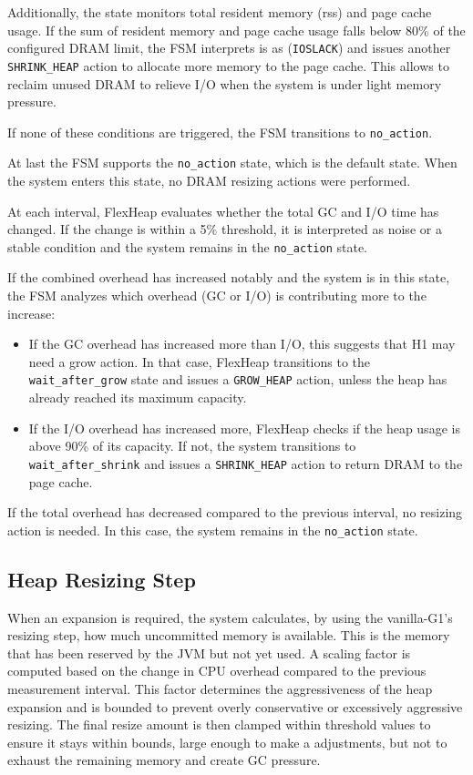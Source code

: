 Additionally, the state monitors total resident memory (rss) and page cache
usage. If the sum of resident memory and page cache usage falls below 80\% of
the configured DRAM limit, the FSM interprets is as (\texttt{IOSLACK}) and
issues another \texttt{SHRINK\_HEAP} action to allocate more memory to the page
cache. This allows to reclaim unused DRAM to relieve I/O when the system is
under light memory pressure.

If none of these conditions are triggered, the FSM
transitions to \texttt{no\_action}.

At last the FSM supports the \texttt{no\_action} state, which is the default state.
When the system enters this state, no DRAM resizing actions were performed.

At each interval, FlexHeap evaluates whether the total GC and I/O time has
changed. If the change is within a 5\% threshold, it is interpreted
as noise or a stable condition and the system remains in the \texttt{no\_action} state.

If the combined overhead has increased notably and the system is in this state, the FSM analyzes which overhead (GC or I/O) is
contributing more to the increase:
\begin{itemize}
	\item If the GC overhead has increased more than I/O, this suggests that H1 may need a grow action.
	      In that case, FlexHeap transitions to the \texttt{wait\_after\_grow} state and issues a \texttt{GROW\_HEAP} action,
	      unless the heap has already reached its maximum capacity.

	\item If the I/O overhead has increased more, FlexHeap checks if the heap usage is above 90\% of
	      its capacity. If not, the system transitions to \texttt{wait\_after\_shrink} and issues a \texttt{SHRINK\_HEAP}
	      action to return DRAM to the page cache.
\end{itemize}

If the total overhead has decreased compared to the previous interval, no resizing action is needed. In this case,
the system remains in the \texttt{no\_action} state.

\subsection{Heap Resizing Step}

When an expansion is required, the system calculates, by using the vanilla-G1's
resizing step, how much uncommitted memory is available. This is the memory
that has been reserved by the JVM but not yet used. A scaling factor is
computed based on the change in CPU overhead compared to the previous
measurement interval. This factor determines the aggressiveness of the heap
expansion and is bounded to prevent overly conservative or excessively
aggressive resizing. The final resize amount is then clamped within threshold
values to ensure it stays within bounds, large enough to make a adjustments,
but not to exhaust the remaining memory and create GC pressure.

